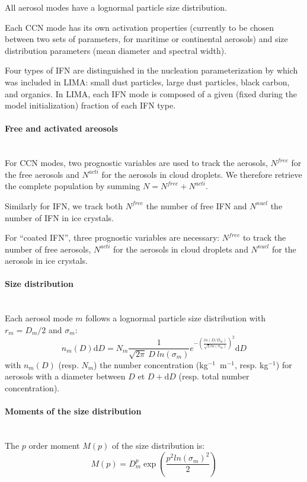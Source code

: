 All aerosol modes have a lognormal particle size distribution.

Each CCN mode has its own activation properties (currently to be chosen between two sets of parameters, for maritime or continental aerosols) and size distribution parameters (mean diameter and spectral width).

Four types of IFN are distinguished in the nucleation parameterization by \citet{Phillips2008} which was included in LIMA: small dust particles, large dust particles, black carbon, and organics. In LIMA, each IFN mode is composed of a given (fixed during the model initialization) fraction of each IFN type.

\paragraph{Free and activated areosols}
~\\
For CCN modes, two prognostic variables are used to track the aerosols, $N^{free}$ for the free aerosols and $N^{acti}$ for the aerosols in cloud droplets. We therefore retrieve the complete population by summing $N = N^{free} + N^{acti}$.

Similarly for IFN, we track both $N^{free}$ the number of free IFN and $N^{nucl}$ the number of IFN in ice crystals.

For ``coated IFN'', three prognostic variables are necessary: $N^{free}$ to track the number of free aerosols, $N^{acti}$ for the aerosols in cloud droplets and $N^{nucl}$ for the aerosols in ice crystals.

\paragraph{Size distribution}
~\\
Each aerosol mode $m$ follows a lognormal particle size distribution with $r_m=D_m/2$ and $\sigma_m$:
\begin{equation}
 n_m(D) \mathrm{d}D = N_m \frac{1}{\sqrt{2\pi}~D~ln(\sigma_m)}e^{-\left(\frac{ln(D/D_m)}{\sqrt{2}ln(\sigma_m)}\right)^2} \mathrm{d}D
\end{equation}
with $n_m(D)$ (resp. $N_m$) the number concentration (kg$^{-1}$~m$^{-1}$, resp. kg$^{-1}$) for aerosols with a diameter between $D$ et $D+\mathrm d D$ (resp. total number concentration).

\paragraph{Moments of the size distribution}
~\\
The $p$ order moment $M(p)$ of the size distribution is:
\begin{equation}
 M(p) = D_m^p \exp\left( \frac{p^2 ln(\sigma_m)^2}{2} \right)
\end{equation}


